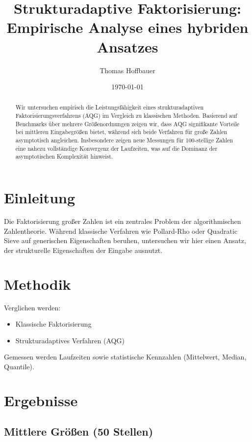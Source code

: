 \documentclass[11pt,a4paper]{article}
\title{Strukturadaptive Faktorisierung: Empirische Analyse eines hybriden Ansatzes}
\author{Thomas Hoffbauer}
\date{\today}
\begin{document}
	
	\maketitle
	
	\begin{abstract}
		Wir untersuchen empirisch die Leistungsfähigkeit eines strukturadaptiven Faktorisierungsverfahrens (AQG) im Vergleich zu klassischen Methoden. Basierend auf Benchmarks über mehrere Größenordnungen zeigen wir, dass AQG signifikante Vorteile bei mittleren Eingabegrößen bietet, während sich beide Verfahren für große Zahlen asymptotisch angleichen. Insbesondere zeigen neue Messungen für 100-stellige Zahlen eine nahezu vollständige Konvergenz der Laufzeiten, was auf die Dominanz der asymptotischen Komplexität hinweist.
	\end{abstract}
	
	\section{Einleitung}
	
	Die Faktorisierung großer Zahlen ist ein zentrales Problem der algorithmischen Zahlentheorie. Während klassische Verfahren wie Pollard-Rho oder Quadratic Sieve auf generischen Eigenschaften beruhen, untersuchen wir hier einen Ansatz, der strukturelle Eigenschaften der Eingabe ausnutzt.
	
	\section{Methodik}
	
	Verglichen werden:
	\begin{itemize}
		\item Klassische Faktorisierung
		\item Strukturadaptives Verfahren (AQG)
	\end{itemize}
	
	Gemessen werden Laufzeiten sowie statistische Kennzahlen (Mittelwert, Median, Quantile).
	
	\section{Ergebnisse}
	
	\subsection{Mittlere Größen (50 Stellen)}
	
\end{document}
